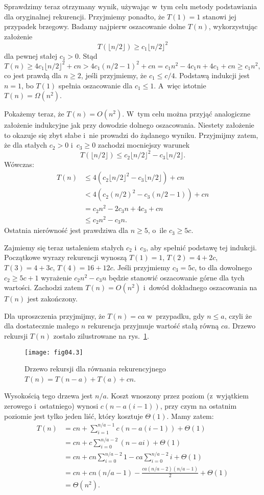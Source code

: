 Sprawdzimy teraz otrzymany wynik, używając w~tym celu metody podstawiania dla oryginalnej rekurencji. Przyjmiemy ponadto, że $T(1)=1$ stanowi jej przypadek brzegowy. Badamy najpierw oszacowanie dolne $T(n)$, wykorzystując założenie
\[
	T(\lfloor n/2\rfloor) \ge c_1\lfloor n/2\rfloor^2
\]
dla pewnej stałej $c_1>0$. Stąd
\[
	T(n) \ge 4c_1\lfloor n/2\rfloor^2+cn > 4c_1(n/2-1)^2+cn = c_1n^2-4c_1n+4c_1+cn \ge c_1n^2,
\]
co jest prawdą dla $n\ge2$, jeśli przyjmiemy, że $c_1\le c/4$. Podstawą indukcji jest $n=1$, bo $T(1)$ spełnia oszacowanie dla $c_1\le1$. A~więc istotnie $T(n)=\Omega(n^2)$.

Pokażemy teraz, że $T(n)=O(n^2)$. W~tym celu można przyjąć analogiczne założenie indukcyjne jak przy dowodzie dolnego oszacowania. Niestety założenie to okazuje się zbyt słabe i~nie prowadzi do żądanego wyniku. Przyjmijmy zatem, że dla stałych $c_2>0$ i~$c_3\ge0$ zachodzi mocniejszy warunek
\[
	T(\lfloor n/2\rfloor) \le c_2\lfloor n/2\rfloor^2-c_3\lfloor n/2\rfloor.
\]
Wówczas:
\begin{align*}
	T(n) &\le 4(c_2\lfloor n/2\rfloor^2-c_3\lfloor n/2\rfloor)+cn \\
	&< 4(c_2(n/2)^2-c_3(n/2-1))+cn \\
	&= c_2n^2-2c_3n+4c_3+cn \\
	&\le c_2n^2-c_3n.
\end{align*}
Ostatnia nierówność jest prawdziwa dla $n\ge5$, o~ile $c_3\ge5c$.

Zajmiemy się teraz ustaleniem stałych $c_2$ i~$c_3$, aby spełnić podstawę tej indukcji. Początkowe wyrazy rekurencji wynoszą $T(1)=1$, $T(2)=4+2c$, $T(3)=4+3c$, $T(4)=16+12c$. Jeśli przyjmiemy $c_3=5c$, to dla dowolnego $c_2\ge5c+1$ wyrażenie $c_2n^2-c_3n$ będzie stanowić oszacowanie górne dla tych wartości. Zachodzi zatem $T(n)=O(n^2)$ i~dowód dokładnego oszacowania na $T(n)$ jest zakończony.

\exercise %
Dla uproszczenia przyjmijmy, że $T(n)=ca$ w~przypadku, gdy $n\le a$, czyli że dla dostatecznie małego $n$ rekurencja przyjmuje wartość stałą równą $ca$. Drzewo rekursji $T(n)$ zostało zilustrowane na rys.~\ref{fig:4.2-4}.
\begin{figure}[ht]
	\begin{center}
		\texttt{[image: fig04.3]}
	\end{center}
	\caption{Drzewo rekursji dla równania rekurencyjnego $T(n)=T(n-a)+T(a)+cn$.} \label{fig:4.2-4}
\end{figure}
Wysokością tego drzewa jest $n/a$. Koszt wnoszony przez  poziom (z~wyjątkiem zerowego i~ostatniego) wynosi $c(n-a(i-1))$, przy czym na ostatnim poziomie jest tylko jeden liść, który kosztuje $\Theta(1)$. Mamy zatem:
\begin{align*}
	T(n) &= cn+\sum_{i=1}^{n/a-1}c(n-a(i-1))+\Theta(1) \\
	&= cn+c\sum_{i=0}^{n/a-2}(n-ai)+\Theta(1) \\
	&= cn+cn\sum_{i=0}^{n/a-2}1-ca\sum_{i=0}^{n/a-2}i+\Theta(1) \\
	&= cn+cn(n/a-1)-\frac{ca(n/a-2)(n/a-1)}{2}+\Theta(1) \\
	&= \Theta(n^2).
\end{align*}

